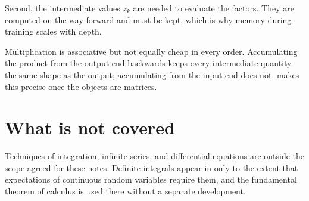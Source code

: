 Second, the intermediate values \(z_k\) are needed to evaluate the factors. They
are computed on the way forward and must be kept, which is why memory during
training scales with depth.

\begin{remark}
Multiplication is associative but not equally cheap in every order. Accumulating
the product from the output end backwards keeps every intermediate quantity the
same shape as the output; accumulating from the input end does not.
 makes this precise once the objects are matrices.
\end{remark}

\section{What is not covered}

Techniques of integration, infinite series, and differential equations are
outside the scope agreed for these notes. Definite integrals appear in
 only to the extent that expectations of continuous random
variables require them, and the fundamental theorem of calculus is used there
without a separate development.
